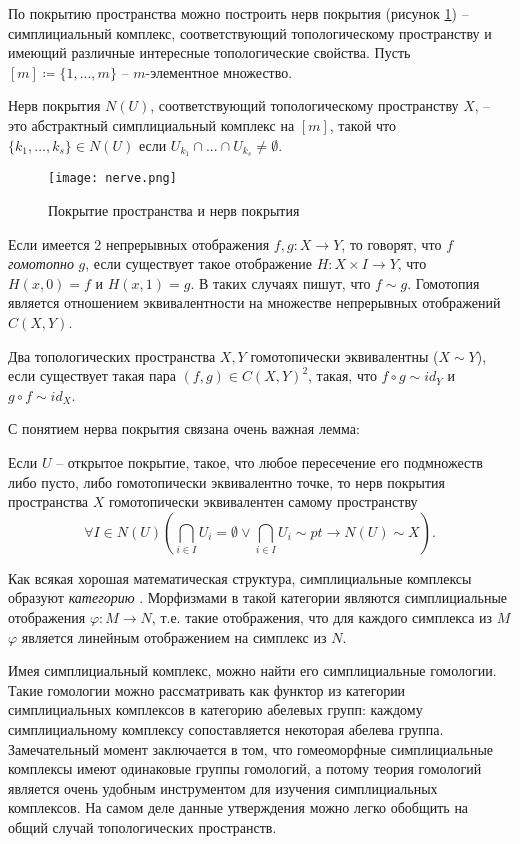По покрытию пространства можно построить нерв покрытия  (рисунок \ref{nerve}) -- симплициальный комплекс, соответствующий топологическому пространству и имеющий различные интересные топологические свойства. Пусть $ [m] \coloneqq \{1, ..., m\} $ -- $m$-элементное множество.
\begin{definition}
	Нерв покрытия $N(U)$, соответствующий топологическому пространству $X$, -- это абстрактный симплициальный комплекс на $[m]$, такой что $ \{k_1, ..., k_s\} \in N(U) $ если $ U_{k_1} \cap ... \cap U_{k_s} \neq \emptyset $.
\end{definition}
\begin{figure}[h!]
	\begin{center}
		\texttt{[image: nerve.png]}\\
		\caption{Покрытие пространства и нерв покрытия}
		\label{nerve}
	\end{center}
\end{figure}
Если имеется 2 непрерывных отображения $f, g : X \to Y$, то говорят, что $f$ {\it гомотопно} $g$, если существует такое отображение ${H: X\times I \to Y}$, что ${H(x,0) = f}$ и ${H(x,1) = g}$. В таких случаях пишут, что ${f \sim g}$. Гомотопия является отношением эквивалентности на множестве непрерывных отображений ${ C(X,Y) }$.


Два топологических пространства $X,Y$ гомотопически эквивалентны (${X \sim Y}$), если существует такая пара ${(f,g) \in C(X,Y)^2}$, такая, что ${f \circ g \sim id_Y}$ и ${g \circ f \sim id_X}$.

С понятием нерва покрытия связана очень важная лемма:
\begin{lemma*}[о нерве]
	Если $U$ -- открытое покрытие, такое, что любое пересечение его подмножеств либо пусто, либо гомотопически эквивалентно точке, то нерв покрытия пространства $X$ гомотопически эквивалентен самому пространству
	\[ \forall I \in N(U) \left( \bigcap\limits_{i \in I} U_i = \emptyset \lor \bigcap\limits_{i \in I} U_i \sim pt \rightarrow N(U) \sim X \right). \]
\end{lemma*}

Как всякая хорошая математическая структура, симплициальные комплексы образуют {\it категорию} . Морфизмами в такой категории являются симплициальные отображения $\varphi : M \to N$, т.е. такие отображения, что для каждого симплекса из $M$ $\varphi$ является линейным отображением на симплекс из $N$. 

Имея симплициальный комплекс, можно найти его симплициальные гомологии. Такие гомологии можно рассматривать как функтор из категории симплициальных комплексов в категорию абелевых групп: каждому симплициальному комплексу сопоставляется некоторая абелева группа. Замечательный момент заключается в том, что гомеоморфные симплициальные комплексы имеют одинаковые группы гомологий, а потому теория гомологий является очень удобным инструментом для изучения симплициальных комплексов. На самом деле данные утверждения можно легко обобщить на общий случай топологических пространств.

